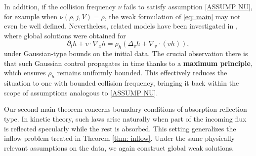 \documentclass[10pt, reqno]{amsart}
\theoremstyle{plain}
\theoremstyle{definition}
\theoremstyle{remark}
\numberwithin{equation}{section}
\newcommand{\p}{\partial}
\begin{document}
In addition, if the collision frequency $\nu$ fails to satisfy assumption \eqref{ASSUMP NU}, for example when $\nu(\rho,j,V)=\rho$, the weak formulation of \eqref{eq: main} may not even be well defined. Nevertheless, related models have been investigated in \cite{ImbertMouhot21, AnceschiZhu24}, where global solutions were obtained for
\[%
    \p_t h + v\cdot \nabla_x h = \rho_h(\Delta_v h + \nabla_v\cdot(vh)),
\]%
under Gaussian-type bounds on the initial data. The crucial observation there is that such Gaussian control propagates in time thanks to a \textbf{maximum principle}, which ensures $\rho_h$ remains uniformly bounded. This effectively reduces the situation to one with bounded collision frequency, bringing it back within the scope of assumptions analogous to \eqref{ASSUMP NU}.

 
Our second main theorem concerns boundary conditions of absorption-reflection type. In kinetic theory, such laws arise naturally when part of the incoming flux is reflected specularly while the rest is absorbed. This setting generalizes the inflow problem treated in Theorem \ref{thm: inflow}. Under the same physically relevant assumptions on the data, we again construct global weak solutions.
\end{document}
